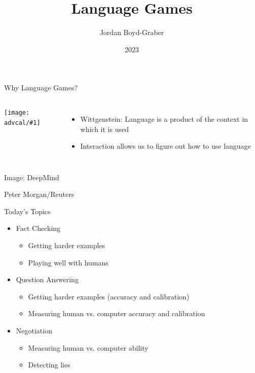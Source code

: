 \documentclass[compress]{beamer}
\title[]{Language Games}
\author{ Jordan Boyd-Graber}
\date{2023}
\institute[] %
{University of Maryland}
\newcommand{\fsi}[2]{
\begin{frame}[plain]
\vspace*{-1pt}
\makebox[\linewidth]{\texttt{[image: \#1]}}
\begin{center}
#2
\end{center}
\end{frame}
}
\newcommand{\gfxa}[2]{
	\begin{center}
		\texttt{[image: advcal/\#1]}
	\end{center}
}
\begin{document}
\frame{
\titlepage
\tiny
}


\begin{frame}{Why Language Games?}


  \begin{columns}


    \gfxa{wittgenstein}{.8}




    \begin{itemize}

      \item Wittgenstein: Language is a product of the context in which it is
        used
      \item Interaction allows us to figure out how to use language
    \end{itemize}


    \end{columns}

  

\end{frame}

\fsi{qb/starcraft}{Image: DeepMind}
\fsi{qb/DeepBlue}{Peter Morgan/Reuters}

\begin{frame}{Today's Topics}
	\begin{itemize}
	\item Fact Checking
	\begin{itemize}
		\item Getting harder examples
		\item Playing well with humans
	\end{itemize}
	\item Question Answering
	\begin{itemize}
		\item Getting harder examples (accuracy and calibration)
		\item Measuring human vs. computer accuracy and calibration
	\end{itemize}
	\item Negotiation
	\begin{itemize}
		\item Measuring human vs. computer ability
		\item Detecting lies
	\end{itemize}
	\end{itemize}
\end{frame}
\end{document}
